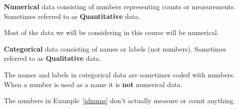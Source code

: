 \documentclass{beamer}
\begin{document}
\begin{frame}
\begin{definition}
\textbf{Numerical} data consisting of numbers representing counts or measurements. Sometimes referred to as \textbf{Quantitative} data.
\end{definition}\pause

\begin{note}
Most of the data we will be considering in this course will be numerical.
\end{note}\pause

\begin{definition}
\textbf{Categorical} data consisting of names or labels (not numbers). Sometimes referred to as \textbf{Qualitative} data.
\end{definition}\pause

\begin{note}
The names and labels in categorical data are sometimes coded with numbers. When a number is used as a name it is \textbf{not} numerical data.
\end{note}
\end{frame}

\begin{frame}
\begin{example}
\pause
{}
\end{example}\pause

\begin{example}
\pause
{}
\end{example}\pause

\begin{example}\label{idnums}
\pause
{}
\end{example}\pause

\begin{note}
The numbers in Example~\ref{idnums} don't actually measure or count anything.
\end{note}
\end{frame}
\end{document}

